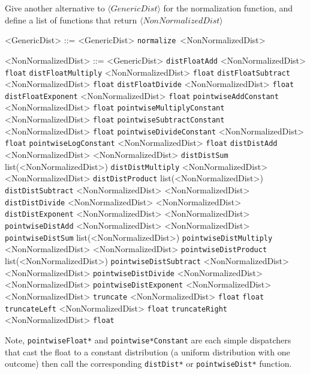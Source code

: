 \documentclass[../main.tex]{subfiles}
\begin{document}
Give another alternative to $\langle \textit{GenericDist} \rangle$ for the normalization function, and define a list of functions that return $\langle \textit{NonNormalizedDist} \rangle$
\begin{grammar}
  <GenericDist> ::= <GenericDist> \alt \texttt{normalize}\ <NonNormalizedDist>

  <NonNormalizedDist> ::=
    <GenericDist>
    \alt \texttt{distFloatAdd} <NonNormalizedDist> \texttt{float}
    \alt \texttt{distFloatMultiply} <NonNormalizedDist> \texttt{float}
    \alt \texttt{distFloatSubtract} <NonNormalizedDist> \texttt{float}
    \alt \texttt{distFloatDivide} <NonNormalizedDist> \texttt{float}
    \alt \texttt{distFloatExponent} <NonNormalizedDist> \texttt{float}
    \alt \texttt{pointwiseAddConstant} <NonNormalizedDist> \texttt{float}
    \alt \texttt{pointwiseMultiplyConstant} <NonNormalizedDist> \texttt{float}
    \alt \texttt{pointwiseSubtractConstant} <NonNormalizedDist> \texttt{float}
    \alt \texttt{pointwiseDivideConstant} <NonNormalizedDist> \texttt{float}
    \alt \texttt{pointwiseLogConstant} <NonNormalizedDist> \texttt{float}
    \alt \texttt{distDistAdd} <NonNormalizedDist> <NonNormalizedDist>
    \alt \texttt{distDistSum} list(<NonNormalizedDist>)
    \alt \texttt{distDistMultiply} <NonNormalizedDist> <NonNormalizedDist>
    \alt \texttt{distDistProduct} list(<NonNormalizedDist>)
    \alt \texttt{distDistSubtract} <NonNormalizedDist> <NonNormalizedDist>
    \alt \texttt{distDistDivide} <NonNormalizedDist> <NonNormalizedDist>
    \alt \texttt{distDistExponent} <NonNormalizedDist> <NonNormalizedDist>
    \alt \texttt{pointwiseDistAdd} <NonNormalizedDist> <NonNormalizedDist>
    \alt \texttt{pointwiseDistSum} list(<NonNormalizedDist>)
    \alt \texttt{pointwiseDistMultiply} <NonNormalizedDist> <NonNormalizedDist>
    \alt \texttt{pointwiseDistProduct} list(<NonNormalizedDist>)
    \alt \texttt{pointwiseDistSubtract} <NonNormalizedDist> <NonNormalizedDist>
    \alt \texttt{pointwiseDistDivide} <NonNormalizedDist> <NonNormalizedDist>
    \alt \texttt{pointwiseDistExponent} <NonNormalizedDist> <NonNormalizedDist>
    \alt \texttt{truncate} <NonNormalizedDist> \texttt{float} \texttt{float}
    \alt \texttt{truncateLeft} <NonNormalizedDist> \texttt{float}
    \alt \texttt{truncateRight} <NonNormalizedDist> \texttt{float}
\end{grammar}\label{gram:nonnormdist}

Note, \texttt{pointwiseFloat*} and \texttt{pointwise*Constant} are each simple dispatchers that cast the float to a constant distribution (a uniform distribution with one outcome) then call the corresponding \texttt{distDist*} or \texttt{pointwiseDist*} function.
\end{document}
